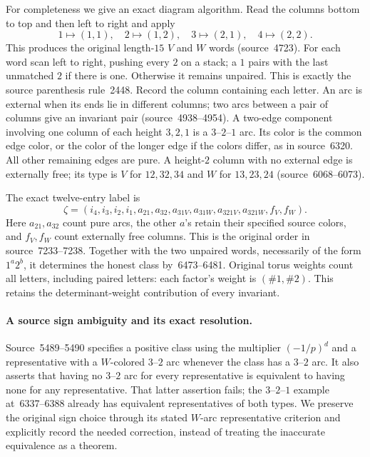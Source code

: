 For completeness we give an exact diagram algorithm.  Read the columns
bottom to top and then left to right and apply
\[
 1\mapsto(1,1),\quad2\mapsto(1,2),\quad
 3\mapsto(2,1),\quad4\mapsto(2,2).
\]
This produces the original length-$15$ $V$ and $W$ words (source~4723).
For each word scan left to right, pushing every $2$ on a stack; a $1$
pairs with the last unmatched $2$ if there is one.  Otherwise it remains
unpaired.  This is exactly the source parenthesis rule~2448.  Record the
column containing each letter.  An arc is external when its ends lie in
different columns; two arcs between a pair of columns give an invariant
pair (source~4938--4954).  A two-edge component involving one column of
each height $3,2,1$ is a $3$--$2$--$1$ arc.  Its color is the common
edge color, or the color of the longer edge if the colors differ, as in
source~6320.  All other remaining edges are pure.  A height-$2$ column
with no external edge is externally free; its type is $V$ for
$12,32,34$ and $W$ for $13,23,24$ (source~6068--6073).

The exact twelve-entry label is
\begin{equation}\label{fullbasis:zeta}
 \zeta=(i_4,i_3,i_2,i_1,a_{21},a_{32},a_{31V},a_{31W},
                 a_{321V},a_{321W},f_V,f_W).
\end{equation}
Here $a_{21},a_{32}$ count pure arcs, the other $a$'s retain their
specified source colors, and $f_V,f_W$ count externally free columns.
This is the original order in source~7233--7238.  Together with the two
unpaired words, necessarily of the form $1^a2^b$, it determines the
honest class by~6473--6481.  Original torus weights count all letters,
including paired letters: each factor's weight is
$(\#1,\#2)$.  This retains the determinant-weight contribution of every
invariant.

\paragraph{A source sign ambiguity and its exact resolution.}
Source~5489--5490 specifies a positive class using the multiplier
$(-1/p)^d$ and a representative with a $W$-colored $3$--$2$ arc whenever
the class has a $3$--$2$ arc.  It also asserts that having no $3$--$2$
arc for every representative is equivalent to having none for any
representative.  That latter assertion fails; the $3$--$2$--$1$ example
at~6337--6388 already has equivalent representatives of both types.
We preserve the original sign choice through its stated
$W$-arc representative criterion and explicitly record the needed
correction, instead of treating the inaccurate equivalence as a theorem.

